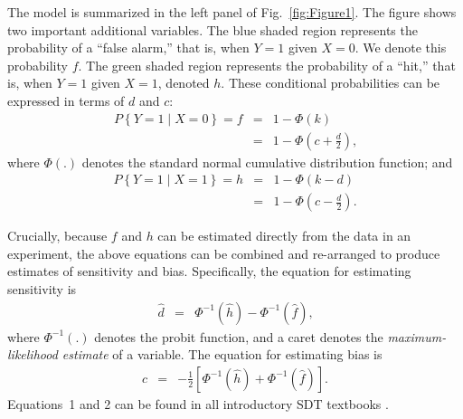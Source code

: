 \documentclass[man]{apa6}
\begin{document}
The model is summarized in the left panel of Fig.~\ref{fig:Figure1}. The figure shows two important additional variables. The blue shaded region represents the probability of a ``false alarm,'' that is, when $Y=1$ given $X=0$. We denote this probability $f$. The green shaded region represents the probability of a ``hit,'' that is, when $Y=1$ given $X=1$, denoted $h$. These conditional probabilities can be expressed in terms of $d$ and $c$:
\begin{eqnarray*}
P\left\{Y=1\mid{}X=0\right\}=f&=&1-\Phi\left(k\right)\\
&=&1-\Phi\left(c+\frac{d}{2}\right)\textrm{,}
\end{eqnarray*}where $\Phi\left(.\right)$ denotes the standard normal cumulative distribution function; and
\begin{eqnarray*}
P\left\{Y=1\mid{}X=1\right\}=h&=&1-\Phi\left(k-d\right)\\
&=&1-\Phi\left(c-\frac{d}{2}\right)\textrm{.}
\end{eqnarray*}


Crucially, because $f$ and $h$ can be estimated directly from the data in an experiment, the above equations can be combined and re-arranged to produce estimates of sensitivity and bias. Specifically, the equation for estimating sensitivity is
\begin{eqnarray}
\hat{d}&=&\Phi^{-1}\left(\hat{h}\right)-\Phi^{-1}\left(\hat{f}\right)\textrm{,}
\label{eq1}
\end{eqnarray}where $\Phi^{-1}\left(.\right)$ denotes the probit function, and a caret denotes the \emph{maximum-likelihood estimate} of a variable. The equation for estimating bias is
\begin{eqnarray}
\hat{c}&=&-\frac{1}{2}\left[\Phi^{-1}\left(\hat{h}\right)+\Phi^{-1}\left(\hat{f}\right)\right]\textrm{.}
\label{eq2}
\end{eqnarray}
Equations~1 and 2 can be found in all introductory SDT textbooks \parencite[e.g.,][]{Green1966, Macmillan2005}.
\end{document}
